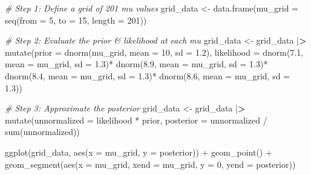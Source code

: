 \documentclass[
]{article}
\newenvironment{Shaded}{\begin{snugshade}}{\end{snugshade}}
\newcommand{\AttributeTok}[1]{\textcolor[rgb]{0.77,0.63,0.00}{#1}}
\newcommand{\CommentTok}[1]{\textcolor[rgb]{0.56,0.35,0.01}{\textit{#1}}}
\newcommand{\DecValTok}[1]{\textcolor[rgb]{0.00,0.00,0.81}{#1}}
\newcommand{\ErrorTok}[1]{\textcolor[rgb]{0.64,0.00,0.00}{\textbf{#1}}}
\newcommand{\FloatTok}[1]{\textcolor[rgb]{0.00,0.00,0.81}{#1}}
\newcommand{\FunctionTok}[1]{\textcolor[rgb]{0.00,0.00,0.00}{#1}}
\newcommand{\NormalTok}[1]{#1}
\newcommand{\OtherTok}[1]{\textcolor[rgb]{0.56,0.35,0.01}{#1}}
\newcommand{\SpecialCharTok}[1]{\textcolor[rgb]{0.00,0.00,0.00}{#1}}
\begin{document}
\begin{Shaded}
\begin{Highlighting}[]
\CommentTok{\# Step 1: Define a grid of 201 mu values}
\NormalTok{grid\_data  }\OtherTok{\textless{}{-}} \FunctionTok{data.frame}\NormalTok{(}\AttributeTok{mu\_grid =} \FunctionTok{seq}\NormalTok{(}\AttributeTok{from =} \DecValTok{5}\NormalTok{, }\AttributeTok{to =} \DecValTok{15}\NormalTok{, }\AttributeTok{length =} \DecValTok{201}\NormalTok{)) }

\CommentTok{\# Step 2: Evaluate the prior \& likelihood at each mu}
\NormalTok{grid\_data }\OtherTok{\textless{}{-}}\NormalTok{ grid\_data }\SpecialCharTok{|}\ErrorTok{\textgreater{}} 
  \FunctionTok{mutate}\NormalTok{(}\AttributeTok{prior =} \FunctionTok{dnorm}\NormalTok{(mu\_grid, }\AttributeTok{mean =} \DecValTok{10}\NormalTok{, }\AttributeTok{sd =} \FloatTok{1.2}\NormalTok{), }
         \AttributeTok{likelihood =} \FunctionTok{dnorm}\NormalTok{(}\FloatTok{7.1}\NormalTok{, }\AttributeTok{mean =}\NormalTok{ mu\_grid, }\AttributeTok{sd =} \FloatTok{1.3}\NormalTok{)}\SpecialCharTok{*}
           \FunctionTok{dnorm}\NormalTok{(}\FloatTok{8.9}\NormalTok{, }\AttributeTok{mean =}\NormalTok{ mu\_grid, }\AttributeTok{sd =} \FloatTok{1.3}\NormalTok{)}\SpecialCharTok{*} 
           \FunctionTok{dnorm}\NormalTok{(}\FloatTok{8.4}\NormalTok{, }\AttributeTok{mean =}\NormalTok{ mu\_grid, }\AttributeTok{sd =} \FloatTok{1.3}\NormalTok{)}\SpecialCharTok{*} 
           \FunctionTok{dnorm}\NormalTok{(}\FloatTok{8.6}\NormalTok{, }\AttributeTok{mean =}\NormalTok{ mu\_grid, }\AttributeTok{sd =} \FloatTok{1.3}\NormalTok{))}


\CommentTok{\# Step 3: Approximate the posterior}
\NormalTok{grid\_data }\OtherTok{\textless{}{-}}\NormalTok{ grid\_data }\SpecialCharTok{|}\ErrorTok{\textgreater{}}  
  \FunctionTok{mutate}\NormalTok{(}\AttributeTok{unnormalized =}\NormalTok{ likelihood }\SpecialCharTok{*}\NormalTok{ prior,}
         \AttributeTok{posterior =}\NormalTok{ unnormalized }\SpecialCharTok{/} \FunctionTok{sum}\NormalTok{(unnormalized))}

\FunctionTok{ggplot}\NormalTok{(grid\_data, }\FunctionTok{aes}\NormalTok{(}\AttributeTok{x =}\NormalTok{ mu\_grid, }\AttributeTok{y =}\NormalTok{ posterior)) }\SpecialCharTok{+} 
  \FunctionTok{geom\_point}\NormalTok{() }\SpecialCharTok{+} 
  \FunctionTok{geom\_segment}\NormalTok{(}\FunctionTok{aes}\NormalTok{(}\AttributeTok{x =}\NormalTok{ mu\_grid, }\AttributeTok{xend =}\NormalTok{ mu\_grid, }\AttributeTok{y =} \DecValTok{0}\NormalTok{, }\AttributeTok{yend =}\NormalTok{ posterior))}
\end{Highlighting}
\end{Shaded}
\end{document}
